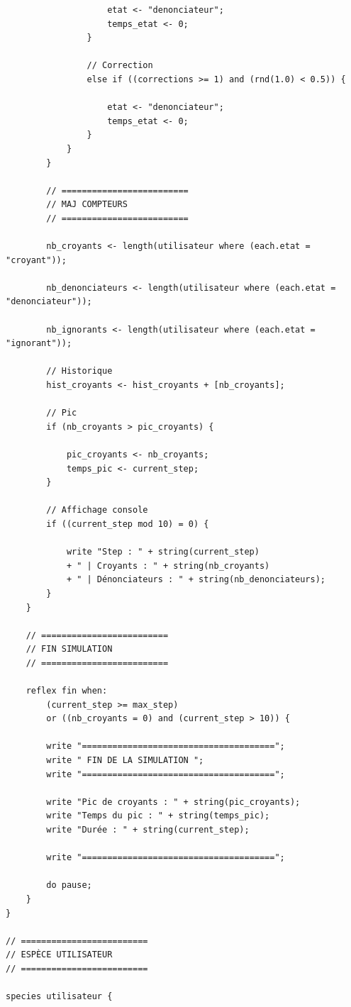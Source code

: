 \documentclass[11pt,a4paper]{article}
\begin{document}
\begin{small}
\begin{verbatim}
                    etat <- "denonciateur";
                    temps_etat <- 0;
                }

                // Correction
                else if ((corrections >= 1) and (rnd(1.0) < 0.5)) {

                    etat <- "denonciateur";
                    temps_etat <- 0;
                }
            }
        }

        // =========================
        // MAJ COMPTEURS
        // =========================

        nb_croyants <- length(utilisateur where (each.etat = "croyant"));

        nb_denonciateurs <- length(utilisateur where (each.etat = "denonciateur"));

        nb_ignorants <- length(utilisateur where (each.etat = "ignorant"));

        // Historique
        hist_croyants <- hist_croyants + [nb_croyants];

        // Pic
        if (nb_croyants > pic_croyants) {

            pic_croyants <- nb_croyants;
            temps_pic <- current_step;
        }

        // Affichage console
        if ((current_step mod 10) = 0) {

            write "Step : " + string(current_step)
            + " | Croyants : " + string(nb_croyants)
            + " | Dénonciateurs : " + string(nb_denonciateurs);
        }
    }

    // =========================
    // FIN SIMULATION
    // =========================

    reflex fin when:
        (current_step >= max_step)
        or ((nb_croyants = 0) and (current_step > 10)) {

        write "======================================";
        write " FIN DE LA SIMULATION ";
        write "======================================";

        write "Pic de croyants : " + string(pic_croyants);
        write "Temps du pic : " + string(temps_pic);
        write "Durée : " + string(current_step);

        write "======================================";

        do pause;
    }
}

// =========================
// ESPÈCE UTILISATEUR
// =========================

species utilisateur {


\end{verbatim}
\end{small}
\end{document}
